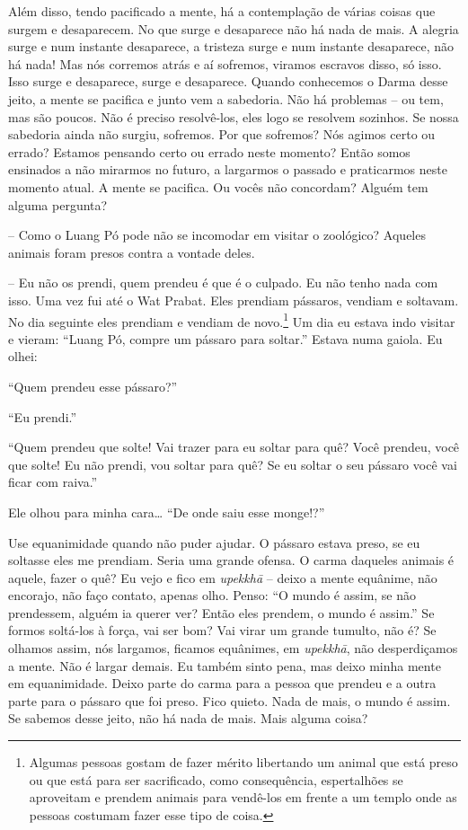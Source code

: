 Além disso, tendo pacificado a mente, há a contemplação de várias
coisas que surgem e desaparecem. No que surge e desaparece não há nada
de mais. A alegria surge e num instante desaparece, a tristeza surge e
num instante desaparece, não há nada! Mas nós corremos atrás e aí
sofremos, viramos escravos disso, só isso. Isso surge e desaparece,
surge e desaparece. Quando conhecemos o Darma desse jeito, a mente se
pacifica e junto vem a sabedoria. Não há problemas – ou tem, mas são
poucos. Não é preciso resolvê-los, eles logo se resolvem sozinhos. Se
nossa sabedoria ainda não surgiu, sofremos. Por que sofremos? Nós
agimos certo ou errado? Estamos pensando certo ou errado neste momento?
Então somos ensinados a não mirarmos no futuro, a largarmos o passado e
praticarmos neste momento atual. A mente se pacifica. Ou vocês não
concordam? Alguém tem alguma pergunta?

-- Como o Luang Pó pode não se incomodar em visitar o zoológico?
Aqueles animais foram presos contra a vontade deles.

-- Eu não os prendi, quem prendeu é que é o culpado. Eu não tenho
nada com isso. Uma vez fui até o Wat Prabat. Eles prendiam pássaros,
vendiam e soltavam. No dia seguinte eles prendiam e vendiam de
novo.\footnote{Algumas pessoas gostam de fazer mérito libertando um
animal que está preso ou que está para ser sacrificado, como
consequência, espertalhões se aproveitam e prendem animais para
vendê-los em frente a um templo onde as pessoas costumam fazer esse
tipo de coisa.} Um dia eu estava indo visitar e vieram: “Luang Pó,
compre um pássaro para soltar.” Estava numa gaiola. Eu olhei:

“Quem prendeu esse pássaro?”

“Eu prendi.”

“Quem prendeu que solte! Vai trazer para eu soltar para quê? Você
prendeu, você que solte! Eu não prendi, vou soltar para quê? Se eu
soltar o seu pássaro você vai ficar com raiva.”

Ele olhou para minha cara\ldots{} “De onde saiu esse monge!?” 

Use equanimidade quando não puder ajudar. O pássaro estava preso, se
eu soltasse eles me prendiam. Seria uma grande ofensa. O carma daqueles
animais é aquele, fazer o quê? Eu vejo e fico em \emph{upekkhā} –
deixo a mente equânime, não encorajo, não faço contato, apenas olho.
Penso: “O mundo é assim, se não prendessem, alguém ia querer ver? Então
eles prendem, o mundo é assim.” Se formos soltá-los à força, vai ser
bom? Vai virar um grande tumulto, não é? Se olhamos assim, nós
largamos, ficamos equânimes, em \emph{upekkhā}, não desperdiçamos a
mente. Não é largar demais. Eu também sinto pena, mas deixo minha mente
em equanimidade. Deixo parte do carma para a pessoa que prendeu e a
outra parte para o pássaro que foi preso. Fico quieto. Nada de mais, o
mundo é assim. Se sabemos desse jeito, não há nada de mais. Mais alguma
coisa?


